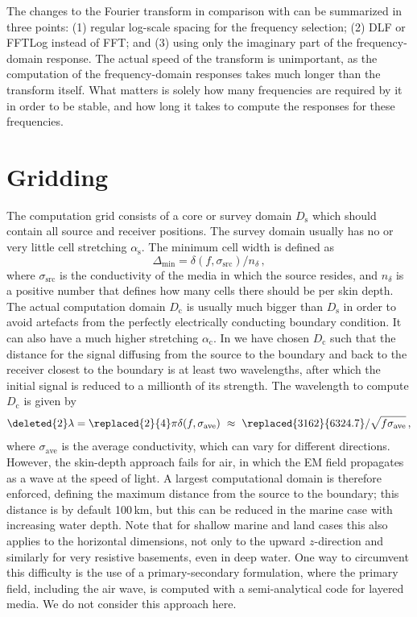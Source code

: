 \documentclass[onecolumn,extra,referee,camera]{gji}
\newcommand{\mr}[1]{\mathrm{#1}}
\begin{document}
The changes to the Fourier transform in comparison with \cite{GEO.08.Mulder}
can be summarized in three points: (1) regular log-scale spacing for the
frequency selection; (2) DLF or FFTLog instead of FFT; and (3) using only the
imaginary part of the frequency-domain response. The actual speed of the
transform is unimportant, as the computation of the frequency-domain responses
takes much longer than the transform itself. What matters is solely how many
frequencies are required by it in order to be stable, and how long it takes to
compute the responses for these frequencies.

\section{Gridding}  %

The computation grid consists of a core or survey domain $D_\mr{s}$ which
should contain all source and receiver positions. The survey domain usually has
no or very little cell stretching $\alpha_\mr{s}$. The minimum cell width is
defined as
%
\begin{equation}
  \Delta_\mr{min}=\delta(f, \sigma_\mr{src})/n_\delta \, ,
  \label{eq:minwidth}
\end{equation}
%
where $\sigma_\mr{src}$ is the conductivity of the media in which the source
resides, and $n_\delta$ is a positive number that defines how many cells there
should be per skin depth. The actual computation domain $D_\mr{c}$ is usually
much bigger than $D_\mr{s}$ in order to avoid artefacts from the perfectly
electrically conducting boundary condition. It can also have a much higher
stretching $\alpha_\mr{c}$. In  we
have chosen $D_\mr{c}$ such that the distance for the signal diffusing from the
source to the boundary and back to the receiver closest to the boundary is at
least two wavelengths, after which the initial signal is reduced to a millionth
of its strength. The wavelength \added{$\lambda$} to compute $D_\mr{c}$ is
given by
%
\begin{equation}
  \deleted{2}\lambda = \replaced{2}{4}\pi\delta(f, \sigma_\mr{ave})
  \ \approx \ \replaced{3162}{6324.7}/\sqrt{f\sigma_\mr{ave}}\, ,
 \label{eq:lambda}
\end{equation}
%
where $\sigma_\mr{ave}$ is the average conductivity, which can vary for
different directions. However, the skin-depth approach fails for air, in which
the EM field propagates as a wave at the speed of light. A largest
computational domain is therefore enforced, defining the maximum distance from
the source to the boundary; this distance is by default 100\,km, but this can
be reduced in the marine case with increasing water depth. Note that for
shallow marine and land cases this also applies to the horizontal dimensions,
not only to the upward $z$-direction and similarly for very resistive
basements, even in deep water. One way to circumvent this difficulty is the use
of a primary-secondary formulation, where the primary field, including the air
wave, is computed with a semi-analytical code for layered media. We do not
consider this approach here.
\end{document}
